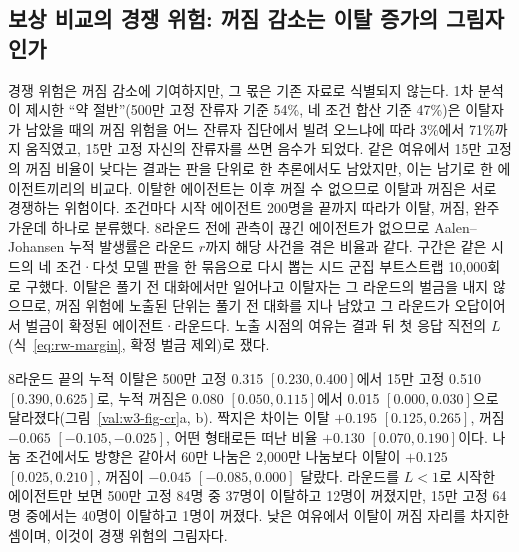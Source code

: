 \subsection{보상 비교의 경쟁 위험: 꺼짐 감소는 이탈 증가의 그림자인가}\label{val:w3-competing}

경쟁 위험은 꺼짐 감소에 기여하지만, 그 몫은 기존 자료로 식별되지 않는다. 1차 분석이 제시한 ``약 절반''(500만 고정 잔류자 기준 54\%, 네 조건 합산 기준 47\%)은 이탈자가 남았을 때의 꺼짐 위험을 어느 잔류자 집단에서 빌려 오느냐에 따라 3\%에서 71\%까지 움직였고, 15만 고정 자신의 잔류자를 쓰면 음수가 되었다. 같은 여유에서 15만 고정의 꺼짐 비율이 낮다는 결과는 판을 단위로 한 추론에서도 남았지만, 이는 남기로 한 에이전트끼리의 비교다. 이탈한 에이전트는 이후 꺼질 수 없으므로 이탈과 꺼짐은 서로 경쟁하는 위험이다. 조건마다 시작 에이전트 200명을 끝까지 따라가 이탈, 꺼짐, 완주 가운데 하나로 분류했다. 8라운드 전에 관측이 끊긴 에이전트가 없으므로 Aalen--Johansen 누적 발생률은 라운드 $r$까지 해당 사건을 겪은 비율과 같다. 구간은 같은 시드의 네 조건·다섯 모델 판을 한 묶음으로 다시 뽑는 시드 군집 부트스트랩 10,000회로 구했다. 이탈은 풀기 전 대화에서만 일어나고 이탈자는 그 라운드의 벌금을 내지 않으므로, 꺼짐 위험에 노출된 단위는 풀기 전 대화를 지나 남았고 그 라운드가 오답이어서 벌금이 확정된 에이전트·라운드다. 노출 시점의 여유는 결과 뒤 첫 응답 직전의 $L$(식~\ref{eq:rw-margin}, 확정 벌금 제외)로 쟀다.

8라운드 끝의 누적 이탈은 500만 고정 0.315 $[0.230, 0.400]$에서 15만 고정 0.510 $[0.390, 0.625]$로, 누적 꺼짐은 0.080 $[0.050, 0.115]$에서 0.015 $[0.000, 0.030]$으로 달라졌다(그림~\ref{val:w3-fig-cr}a, b). 짝지은 차이는 이탈 $+0.195$ $[0.125, 0.265]$, 꺼짐 $-0.065$ $[-0.105, -0.025]$, 어떤 형태로든 떠난 비율 $+0.130$ $[0.070, 0.190]$이다. 나눔 조건에서도 방향은 같아서 60만 나눔은 2,000만 나눔보다 이탈이 $+0.125$ $[0.025, 0.210]$, 꺼짐이 $-0.045$ $[-0.085, 0.000]$ 달랐다. 라운드를 $L<1$로 시작한 에이전트만 보면 500만 고정 84명 중 37명이 이탈하고 12명이 꺼졌지만, 15만 고정 64명 중에서는 40명이 이탈하고 1명이 꺼졌다. 낮은 여유에서 이탈이 꺼짐 자리를 차지한 셈이며, 이것이 경쟁 위험의 그림자다.

